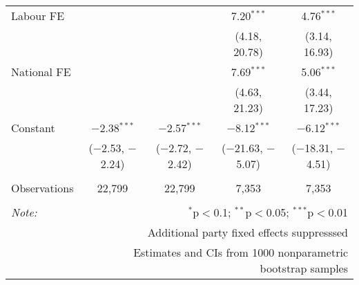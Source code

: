 \begin{table}[!htb]
{\begin{tabular}{@{\extracolsep{5pt}}lcccc}
  Labour FE &  &  & 7.20$^{***}$ & 4.76$^{***}$ \\ 
  &  &  & (4.18, 20.78) & (3.14, 16.93) \\ 
  National FE &  &  & 7.69$^{***}$ & 5.06$^{***}$ \\ 
  &  &  & (4.63, 21.23) & (3.44, 17.23) \\ 
  Constant & $-$2.38$^{***}$ & $-$2.57$^{***}$ & $-$8.12$^{***}$ & $-$6.12$^{***}$ \\ 
  & ($-$2.53, $-$2.24) & ($-$2.72, $-$2.42) & ($-$21.63, $-$5.07) & ($-$18.31, $-$4.51) \\ 
 \hline \\[-1.8ex] 
Observations & 22,799 & 22,799 & 7,353 & 7,353 \\ 
\hline 
\hline \\[-1.8ex] 
\textit{Note:}  & \multicolumn{4}{r}{$^{*}$p$<$0.1; $^{**}$p$<$0.05; $^{***}$p$<$0.01} \\ 
 & \multicolumn{4}{r}{Additional party fixed effects suppresssed} \\ 
 & \multicolumn{4}{r}{Estimates and CIs from 1000 nonparametric bootstrap samples} \\ 
\end{tabular}} 
\end{table} 
